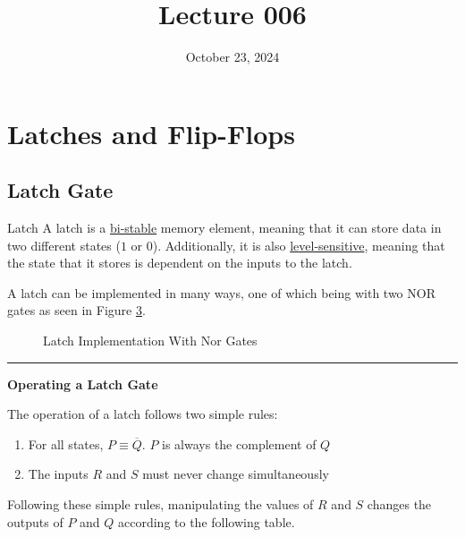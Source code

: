 \documentclass[12pt]{article}
\title{Lecture 006}
\date{October 23, 2024}
\begin{document}
\newpage
\section{Latches and Flip-Flops}
\label{sec:latchesAndFlipFlops}

\subsection{Latch Gate}
\label{ssec:latchGate}

\begin{definition}{Latch}
  A latch is a \uline{bi-stable} memory element, meaning that it can store data in two
  different states ($1$ or $0$). Additionally, it is also \uline{level-sensitive}, meaning
  that the state that it stores is dependent on the inputs to the latch.
\end{definition}
A latch can be implemented in many ways, one of which being with two NOR gates as seen in
Figure \ref{fig:latchCircuit}.

\begin{figure}[H]
  \centering
  \begin{subfigure}[H]{0.5\textwidth}
    \centering
    
    \caption{}
    \label{fig:018}
  \end{subfigure}
  \begin{subfigure}[H]{0.4\textwidth}
    \centering
    
    \caption{}
    \label{fig:019}
  \end{subfigure}
  \caption{Latch Implementation With Nor Gates}
  \label{fig:latchCircuit}
\end{figure}

\hrule

\begin{center}
  {\large \textbf{Operating a Latch Gate}}
\end{center}

The operation of a latch follows two simple rules:
\begin{enumerate}
  \itemsep0em
  \item For all states, $P \equiv \overline{Q}$. $P$ is always the complement of $Q$
  \item The inputs $R$ and $S$ must never change simultaneously
\end{enumerate}

Following these simple rules, manipulating the values of $R$ and $S$ changes the outputs of $P$
and $Q$ according to the following table.
\end{document}
